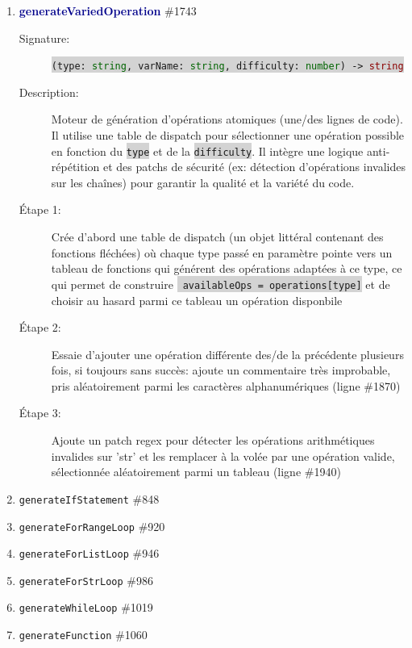 \documentclass[11pt,a4paper]{article}
\newcommand{\code}[1]{\colorbox{lightgray}{\texttt{\small #1}}}
\newcommand{\vartype}[1]{\textcolor{darkgreen}{#1}}
\newcommand{\methodname}[1]{\textbf{\textcolor{darkblue}{#1}}}
\newcommand{\param}[1]{\code{#1}}
\newcommand{\rettype}[1]{\textcolor{darkred}{#1}}
\begin{document}
\begin{enumerate}
    
    \item \methodname{generateVariedOperation} \#1743
\begin{description}
    \item[Signature:] \code{(\param{type}: \vartype{string}, \param{varName}: \vartype{string}, \param{difficulty}: \vartype{number}) -> \rettype{string}}
    \item[Description:] Moteur de génération d'opérations atomiques (une/des lignes de code). Il utilise une table de dispatch pour sélectionner une opération possible en fonction du \param{type} et de la \param{difficulty}. Il intègre une logique anti-répétition et des patchs de sécurité (ex: détection d'opérations invalides sur les chaînes) pour garantir la qualité et la variété du code.
    \item[Étape 1:] Crée d'abord une table de dispatch (un objet littéral contenant des fonctions fléchées) où chaque type passé en paramètre pointe vers un tableau de fonctions qui générent des opérations adaptées à ce type, ce qui permet de construire \code{ availableOps = operations[type]} et de choisir au hasard parmi ce tableau un opération disponbile
    \item[Étape 2:] Essaie d'ajouter une opération différente des/de la précédente plusieurs fois, si toujours sans succès: ajoute un commentaire très improbable, pris aléatoirement parmi les caractères alphanumériques (ligne \#1870)
    \item[Étape 3:] Ajoute un patch regex pour détecter les opérations arithmétiques invalides sur 'str' et les remplacer à la volée par une opération valide, sélectionnée aléatoirement parmi un tableau (ligne \#1940)
\end{description}
    
    \item \texttt{generateIfStatement} \#848
    \item \texttt{generateForRangeLoop} \#920
    \item \texttt{generateForListLoop} \#946
    \item \texttt{generateForStrLoop} \#986
    \item \texttt{generateWhileLoop} \#1019
    \item \texttt{generateFunction} \#1060


\end{enumerate}
\end{document}
